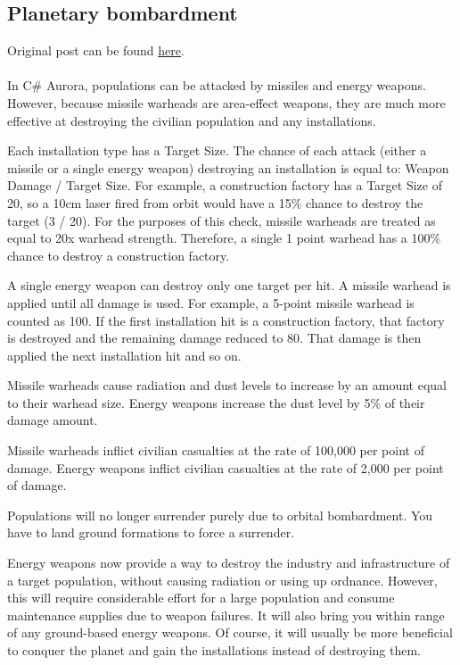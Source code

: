 \documentclass[../../Aurora C# unofficial manual.tex]{subfiles}
\begin{document}
	\subsection{Planetary bombardment}\label{planetary_bombardment}
	Original post can be found
	\href{http://aurora2.pentarch.org/index.php?topic=8495.msg107703#msg107703}{here}.
	\\\\
	
	In C\# Aurora, populations can be attacked by missiles and energy weapons. However, because missile warheads are area-effect weapons, they are much more effective at destroying the civilian population and any installations.
	
	Each installation type has a Target Size. The chance of each attack (either a missile or a single energy weapon) destroying an installation is equal to: Weapon Damage / Target Size. For example, a construction factory has a Target Size of 20, so a 10cm laser fired from orbit would have a 15\% chance to destroy the target (3 / 20). For the purposes of this check, missile warheads are treated as equal to 20x warhead strength. Therefore, a single 1 point warhead has a 100\% chance to destroy a construction factory.
	
	A single energy weapon can destroy only one target per hit. A missile warhead is applied until all damage is used. For example, a 5-point missile warhead is counted as 100. If the first installation hit is a construction factory, that factory is destroyed and the remaining damage reduced to 80. That damage is then applied the next installation hit and so on.
	
	Missile warheads cause radiation and dust levels to increase by an amount equal to their warhead size. Energy weapons increase the dust level by 5\% of their damage amount.
	
	Missile warheads inflict civilian casualties at the rate of 100,000 per point of damage. Energy weapons inflict civilian casualties at the rate of 2,000 per point of damage.
	
	Populations will no longer surrender purely due to orbital bombardment. You have to land ground formations to force a surrender.
	
	Energy weapons now provide a way to destroy the industry and infrastructure of a target population, without causing radiation or using up ordnance. However, this will require considerable effort for a large population and consume maintenance supplies due to weapon failures. It will also bring you within range of any ground-based energy weapons. Of course, it will usually be more beneficial to conquer the planet and gain the installations instead of destroying them.
	
\end{document}
